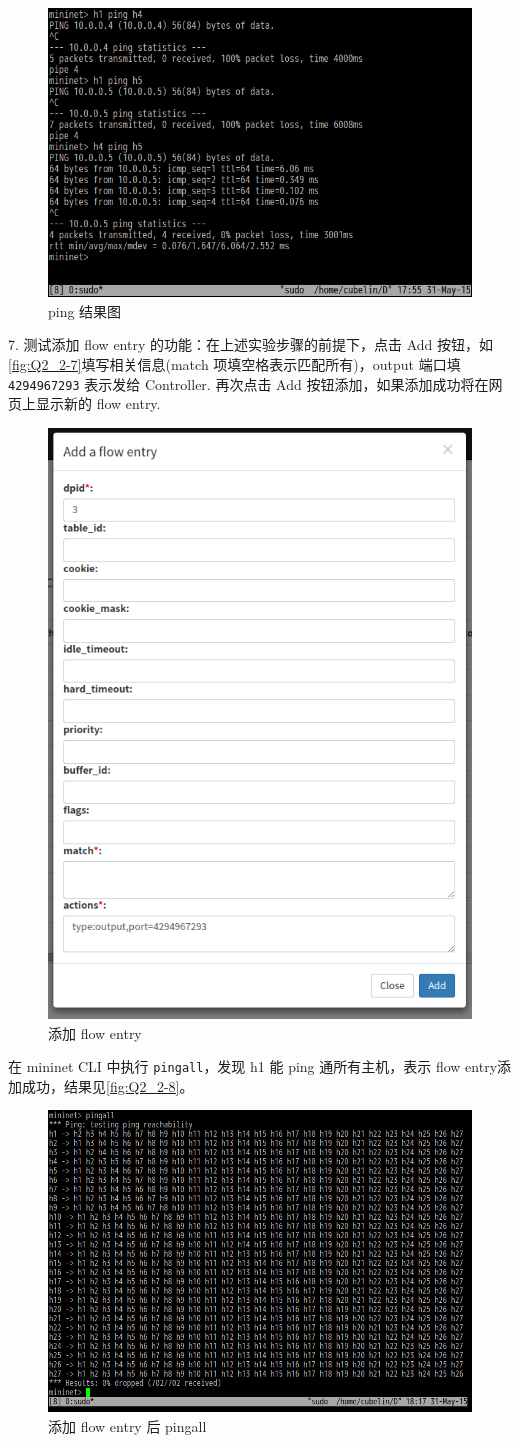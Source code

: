 \documentclass[format=draft,language=chinese,category=SDN]{hustreport}
\newcommand{\code}{\texttt}
\begin{document}
\begin{figure}[!h]
\centering
\includegraphics[width=.618\textwidth]{fig/2_2-6.png}
\caption{ping 结果图}\label{fig:Q2_2-6}
\end{figure}

7. 测试添加 flow entry 的功能：在上述实验步骤的前提下，点击 Add 按钮，如\autoref{fig:Q2_2-7}填写相关信息(match 项填空格表示匹配所有)，output 端口填 \code{4294967293} 表示发给 Controller. 再次点击 Add 按钮添加，如果添加成功将在网页上显示新的 flow entry.

\begin{figure}[!h]
\centering
\includegraphics[width=.618\textwidth]{fig/2_2-7.png}
\caption{添加 flow entry}\label{fig:Q2_2-7}
\end{figure}

在 mininet CLI 中执行 \code{pingall}，发现 h1 能 ping 通所有主机，表示 flow entry添加成功，结果见\autoref{fig:Q2_2-8}。

\begin{figure}[!h]
\centering
\includegraphics[width=.5\textwidth]{fig/2_2-8.png}
\caption{添加 flow entry 后 pingall}\label{fig:Q2_2-8}
\end{figure}
\end{document}

